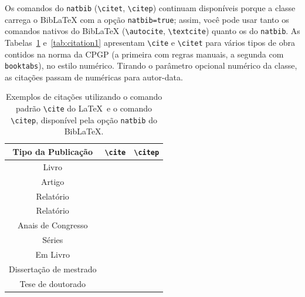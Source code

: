 \documentclass[dsc,pdfa]{coppe}
\begin{document}
  Os comandos do \texttt{natbib} (\verb|\citet|, \verb|\citep|) continuam disponíveis porque a classe carrega o BibLaTeX com a opção \texttt{natbib=true}; assim, você pode usar tanto os comandos nativos do BibLaTeX (\verb|\autocite|, \verb|\textcite|) quanto os do \texttt{natbib}. As Tabelas~\ref{tab:citation} e~\ref{tab:citation1} apresentam \verb|\cite| e \verb|\citet| para vários tipos de obra contidos na norma da CPGP (a primeira com regras manuais, a segunda com \texttt{booktabs}), no estilo numérico. Tirando o parâmetro opcional numérico da classe, as citações passam de numéricas para autor-data.

  \begin{table}[htb]
  \caption{Exemplos de citações utilizando o comando padrão
    \texttt{\textbackslash cite} do \LaTeX\ e
    o comando \texttt{\textbackslash citep},
    disponível pela opção \texttt{natbib} do BibLaTeX.}
  \label{tab:citation}
  \centering
  {\footnotesize
  \begin{tabular}{|c|c|c|}
    \hline
    Tipo da Publicação & \verb|\cite| & \verb|\citep|\\
    \hline
    Livro & \cite{book-example} & \citep{book-example}\\
    Artigo & \cite{article-example} & \citep{article-example}\\
    Relatório & \cite{techreport-example} & \citep{techreport-example}\\
    Relatório & \cite{techreport-exampleIn} & \citep{techreport-exampleIn}\\
    Anais de Congresso & \cite{inproceedings-example} &
      \citep{inproceedings-example}\\
    Séries & \cite{incollection-example} & \citep{incollection-example}\\
    Em Livro & \cite{inbook-example} & \citep{inbook-example}\\
    Dissertação de mestrado & \cite{mastersthesis-example} &
      \citep{mastersthesis-example}\\
    Tese de doutorado & \cite{phdthesis-example} & \citep{phdthesis-example}\\
    \hline
  \end{tabular}}
  \end{table}
\end{document}
